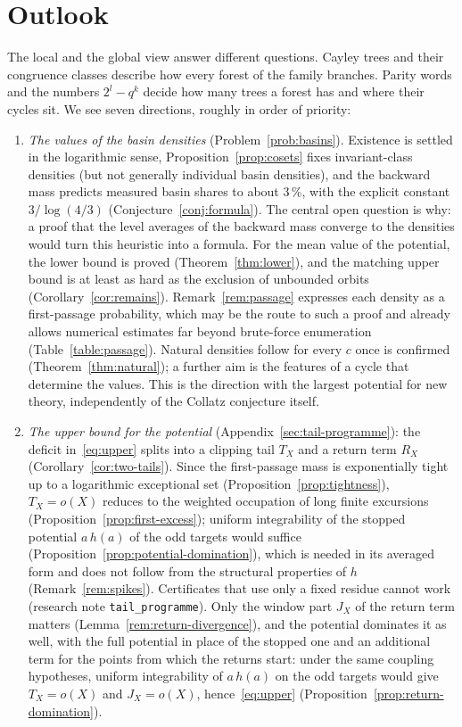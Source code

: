 \documentclass[12pt]{amsart}
\theoremstyle{definition}
\theoremstyle{remark}
\begin{document}
\section{Outlook}
\label{sec:outlook}
The local and the global view answer different questions. Cayley trees and their congruence classes describe how every forest of the family branches. Parity words and the numbers $2^l-q^k$ decide how many trees a forest has and where their cycles sit. We see seven directions, roughly in order of priority:
\begin{enumerate}[label=(\arabic*)]
	\item \emph{The values of the basin densities} (Problem~\ref{prob:basins}). Existence is settled in the logarithmic sense, Proposition~\ref{prop:cosets} fixes invariant-class densities (but not generally individual basin densities), and the backward mass predicts measured basin shares to about $3\,\%$, with the explicit constant $3/\log(4/3)$ (Conjecture~\ref{conj:formula}). The central open question is why: a proof that the level averages of the backward mass converge to the densities would turn this heuristic into a formula. For the mean value of the potential, the lower bound is proved (Theorem~\ref{thm:lower}), and the matching upper bound is at least as hard as the exclusion of unbounded orbits (Corollary~\ref{cor:remains}). Remark~\ref{rem:passage} expresses each density as a first-passage probability, which may be the route to such a proof and already allows numerical estimates far beyond brute-force enumeration (Table~\ref{table:passage}). Natural densities follow for every $c$ once \cite{Allikvere_2026} is confirmed (Theorem~\ref{thm:natural}); a further aim is the features of a cycle that determine the values. This is the direction with the largest potential for new theory, independently of the Collatz conjecture itself.
	\item \emph{The upper bound for the potential} (Appendix~\ref{sec:tail-programme}): the deficit in~\eqref{eq:upper} splits into a clipping tail $T_X$ and a return term $R_X$ (Corollary~\ref{cor:two-tails}). Since the first-passage mass is exponentially tight up to a logarithmic exceptional set (Proposition~\ref{prop:tightness}), $T_X=o(X)$ reduces to the weighted occupation of long finite excursions (Proposition~\ref{prop:first-excess}); uniform integrability of the stopped potential $a\,h(a)$ of the odd targets would suffice (Proposition~\ref{prop:potential-domination}), which is needed in its averaged form and does not follow from the structural properties of $h$ (Remark~\ref{rem:spikes}). Certificates that use only a fixed residue cannot work (research note \texttt{tail\_programme}). Only the window part $J_X$ of the return term matters (Lemma~\ref{rem:return-divergence}), and the potential dominates it as well, with the full potential in place of the stopped one and an additional term for the points from which the returns start: under the same coupling hypotheses, uniform integrability of $a\,h(a)$ on the odd targets would give $T_X=o(X)$ and $J_X=o(X)$, hence~\eqref{eq:upper} (Proposition~\ref{prop:return-domination}).

\end{enumerate}
\end{document}
